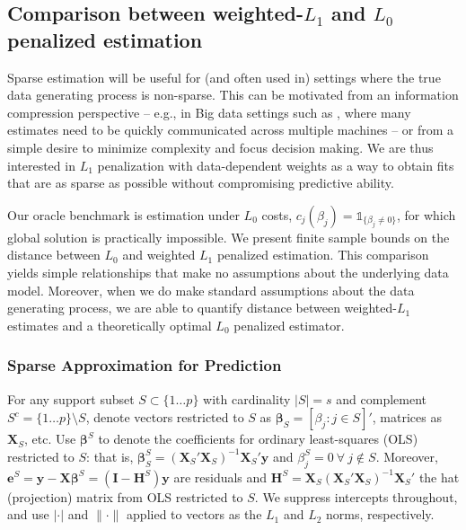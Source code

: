 \documentclass[12pt]{article}
\newcommand{\bs}[1]{\boldsymbol{#1}}
\newcommand{\bm}[1]{\mathbf{#1}}
\newcommand{\ds}[1]{\mathds{#1}}
\begin{document}
\subsection{Comparison between weighted-$L_1$ and $L_0$ penalized estimation}


Sparse estimation will be useful for (and often used in) settings where the
true data generating process is non-sparse. This can be motivated from an
information compression  perspective -- e.g., in Big data settings such as
\cite{taddy_distributed_2013}, where many estimates need to be quickly
communicated across multiple machines -- or from a simple desire to minimize
complexity and focus decision making.    We are thus interested in $L_1$
penalization with data-dependent weights as a way to obtain fits that are as
sparse as possible without compromising predictive ability.  

Our oracle benchmark is estimation under $L_0$ costs, $c_j(\beta_j) =
\ds{1}_{\{\beta_j\neq0\}}$, for which global solution is practically
impossible. We present finite sample bounds on the
distance  between  $L_0$  and weighted
$L_1$ penalized estimation.  This comparison yields simple relationships that
make no assumptions about the underlying data model. Moreover, when we do make
standard assumptions about the data generating process, we are able to
quantify distance between weighted-$L_1$ estimates and a theoretically optimal
$L_0$ penalized estimator.


\subsubsection{Sparse Approximation for Prediction}

 For any support subset $S \subset \{1\ldots p\}$ with cardinality $|S|=s$ and
complement $S^c = \{1\ldots p\}\setminus S$, denote vectors restricted to $S$
as $\bm{\beta}_S = [\beta_j:j\in S]'$, matrices as $\bm{X}_S$, etc.  Use
$\bs{\beta}^S$ to denote the coefficients for ordinary
least-squares (OLS) restricted to $S$: that is, $\bs{\beta}^S_S =
(\bm{X}_S'\bm{X}_S)^{-1}\bm{X}_S'\bm{y}$ and $\beta^{S}_j = 0~\forall~j\notin
S$.  Moreover, $\bm{e}^S = \bm{y}-\bm{X}\bs{\beta}^S =
(\bm{I}-\bm{H}^S)\bm{y}$ are residuals and $\bm{H}^S =
\bm{X}_S(\bm{X}_S'\bm{X}_S)^{-1}\bm{X}_S'$ the hat (projection) matrix from OLS restricted to $S$.  We suppress intercepts throughout, and use $|\cdot|$ and $\|\cdot\|$ applied to vectors as the $L_1$ and $L_2$ norms, respectively.
\end{document}
